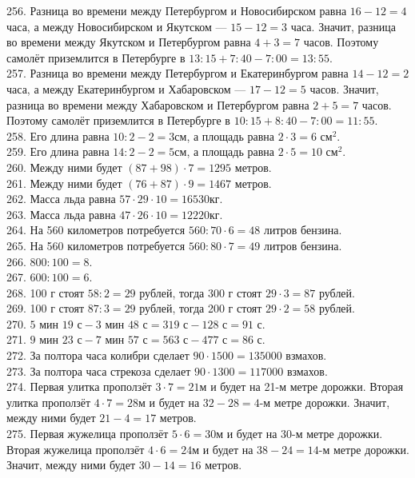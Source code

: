 \documentclass[12pt]{article}
\begin{document}
256. Разница во времени между Петербургом и Новосибирском равна $16-12=4$ часа, а между Новосибирском и Якутском --- $15-12=3$ часа. Значит, разница во времени между Якутском и Петербургом равна $4+3=7$ часов. Поэтому самолёт приземлится в Петербурге в $13:15+7:40-7:00=13:55.$\\
257. Разница во времени между Петербургом и Екатеринбургом равна $14-12=2$ часа, а между Екатеринбургом и Хабаровском --- $17-12=5$ часов. Значит, разница во времени между Хабаровском и Петербургом равна $2+5=7$ часов. Поэтому самолёт приземлится в Петербурге в $10:15+8:40-7:00=11:55.$\\
258. Его длина равна $10:2-2=3$см, а площадь равна $2\cdot3=6\text{ см}^2.$\\
259. Его длина равна $14:2-2=5$см, а площадь равна $2\cdot5=10\text{ см}^2.$\\
260. Между ними будет $(87+98)\cdot7=1295$ метров.\\
261. Между ними будет $(76+87)\cdot9=1467$ метров.\\
262. Масса льда равна $57\cdot29\cdot10=16530$кг.\\
263. Масса льда равна $47\cdot26\cdot10=12220$кг.\\
264. На 560 километров потребуется $560:70\cdot6=48$ литров бензина.\\
265. На 560 километров потребуется $560:80\cdot7=49$ литров бензина.\\
266. $800:100=8.$\\
267. $600:100=6.$\\
268. 100 г стоят $58:2=29$ рублей, тогда 300 г стоят $29\cdot3=87$ рублей.\\
269. 100 г стоят $87:3=29$ рублей, тогда 200 г стоят $29\cdot2=58$ рублей.\\
270. $5\text{ мин }19\text{ с}- 3\text{ мин }48\text{ с}=319\text{ с}-128\text{ с}=91\text{ с}.$\\
271. $9\text{ мин }23\text{ с}- 7\text{ мин }57\text{ с}=563\text{ с}-477\text{ с}=86\text{ с}.$\\
272. За полтора часа колибри сделает $90\cdot1500=135000$ взмахов.\\
273. За полтора часа стрекоза сделает $90\cdot1300=117000$ взмахов.\\
274. Первая улитка проползёт $3\cdot7=21$м и будет на 21-м метре дорожки. Вторая улитка проползёт $4\cdot7=28$м и будет на $32-28=4$-м метре дорожки. Значит, между ними будет $21-4=17$ метров.\\
275. Первая жужелица проползёт $5\cdot6=30$м и будет на 30-м метре дорожки. Вторая жужелица проползёт $4\cdot6=24$м и будет на $38-24=14$-м метре дорожки. Значит, между ними будет $30-14=16$ метров.\\
\end{document}
